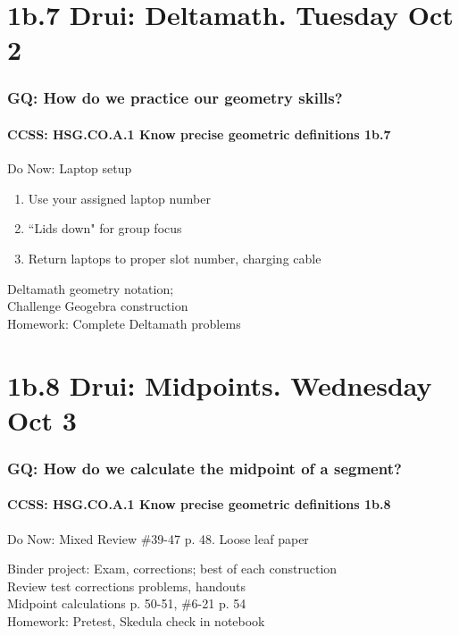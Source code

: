 \documentclass{beamer}
\begin{document}
\section{1b.7 Drui: Deltamath. Tuesday Oct 2}
  \frame
  {
    \frametitle{GQ: How do we practice our geometry skills?}
    \framesubtitle{CCSS: HSG.CO.A.1 Know precise geometric definitions  \alert{1b.7}}

    \begin{block}{Do Now: Laptop setup}
    \begin{enumerate}
        \item Use your assigned laptop number
        \item ``Lids down" for group focus
        \item Return laptops to proper slot number, charging cable
    \end{enumerate}
    \end{block}
    Deltamath geometry notation; \\Challenge Geogebra construction\\
    \vspace{1cm}
    Homework: Complete Deltamath problems
  }

\section{1b.8 Drui: Midpoints. Wednesday Oct 3}
  \frame
  {
    \frametitle{GQ: How do we calculate the midpoint of a segment?}
    \framesubtitle{CCSS: HSG.CO.A.1 Know precise geometric definitions  \alert{1b.8}}

    \begin{block}{Do Now: Mixed Review \#39-47 p. 48. Loose leaf paper}
    \end{block}
    Binder project: Exam, corrections; best of each construction\\
    Review test corrections problems, handouts\\
    Midpoint calculations p. 50-51, \#6-21 p. 54\\
    \vspace{0.5cm}
    Homework: Pretest, Skedula check in notebook
  }
\end{document}
